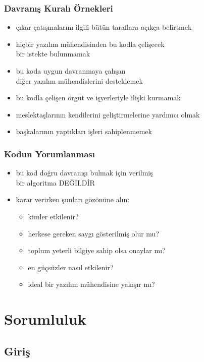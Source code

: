 \documentclass[dvipsnames]{beamer}
\theoremstyle{definition}
\theoremstyle{example}
\theoremstyle{plain}
\begin{document}
\begin{frame}
  \frametitle{Davranış Kuralı Örnekleri}

  \begin{itemize}
    \item çıkar çatışmalarını ilgili bütün taraflara açıkça belirtmek
    \item hiçbir yazılım mühendisinden bu kodla çelişecek\\
      bir istekte bulunmamak
    \item bu koda uygun davranmaya çalışan\\
      diğer yazılım mühendislerini desteklemek
    \item bu kodla çelişen örgüt ve işyerleriyle ilişki kurmamak
    \item meslektaşlarının kendilerini geliştirmelerine yardımcı olmak
    \item başkalarının yaptıkları işleri sahiplenmemek
  \end{itemize}
\end{frame}

\begin{frame}
  \frametitle{Kodun Yorumlanması}

  \begin{itemize}
    \item bu kod doğru davranışı bulmak için verilmiş\\
      bir algoritma \alert{DEĞİLDİR}

    \pause
    \item karar verirken şunları gözönüne alın:

    \begin{itemize}
      \item kimler etkilenir?
      \item herkese gereken saygı gösterilmiş olur mu?
      \item toplum yeterli bilgiye sahip olsa onaylar mı?
      \item en güçsüzler nasıl etkilenir?
      \item ideal bir yazılım mühendisine yakışır mı?
    \end{itemize}
  \end{itemize}
\end{frame}

\section{Sorumluluk}

\subsection{Giriş}
\end{document}
